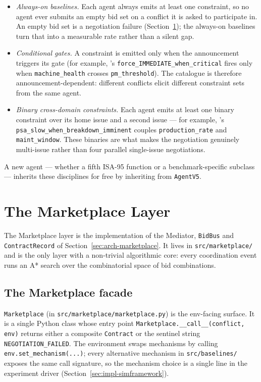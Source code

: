 \begin{itemize}[leftmargin=1.4em,itemsep=0.2em]
  \item \emph{Always-on baselines.} Each agent always emits at least
    one constraint, so no agent ever submits an empty bid set on a
    conflict it is asked to participate in. An empty bid set is a
    negotiation failure (Section~\ref{sec:impl-marketplace}); the
    always-on baselines turn that into a measurable rate rather than a
    silent gap.
  \item \emph{Conditional gates.} A constraint is emitted only when the
    announcement triggers its gate (for example, \PMA{}'s
    \texttt{force\_IMMEDIATE\_when\_critical} fires only when
    \texttt{machine\_health} crosses \texttt{pm\_threshold}). The
    catalogue is therefore announcement-dependent: different
    conflicts elicit different constraint sets from the same agent.
  \item \emph{Binary cross-domain constraints.} Each agent emits at
    least one binary constraint over its home issue and a second issue
    --- for example, \PSA{}'s \texttt{psa\_slow\_when\_breakdown\_imminent}
    couples \texttt{production\_rate} and \texttt{maint\_window}. These
    binaries are what makes the negotiation genuinely multi-issue
    rather than four parallel single-issue negotiations.
\end{itemize}

A new agent --- whether a fifth ISA-95 function or a
benchmark-specific subclass --- inherits these disciplines for free by
inheriting from \texttt{AgentV5}.

\section{The Marketplace Layer}
\label{sec:impl-marketplace}

The Marketplace layer is the implementation of the Mediator,
\texttt{BidBus} and \texttt{ContractRecord} of
Section~\ref{sec:arch-marketplace}. It lives in
\texttt{src/marketplace/} and is the only layer with a non-trivial
algorithmic core: every coordination event runs an A* search over the
combinatorial space of bid combinations.

\subsection{The Marketplace facade}

\texttt{Marketplace} (in \texttt{src/marketplace/marketplace.py}) is the
env-facing surface. It is a single Python class whose entry point
\texttt{Marketplace.\_\_call\_\_(conflict, env)} returns either a
composite \texttt{Contract} or the sentinel string
\texttt{NEGOTIATION\_FAILED}. The environment swaps mechanisms by
calling \texttt{env.set\_mechanism(...)}; every alternative mechanism in
\texttt{src/baselines/} exposes the same call signature, so the
mechanism choice is a single line in the experiment driver
(Section~\ref{sec:impl-simframework}).

